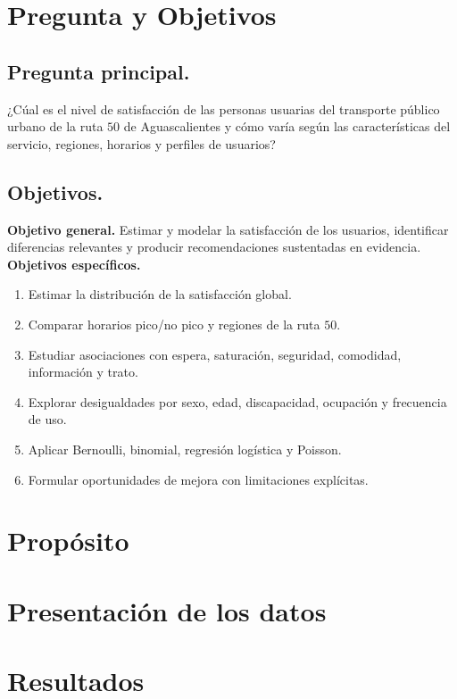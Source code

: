\documentclass{article}
\begin{document}
\section{Pregunta y Objetivos}

\subsection{Pregunta principal.}
¿Cúal es el nivel de satisfacción de las personas usuarias del transporte público urbano de la ruta $50$ de Aguascalientes y cómo varía según las características del servicio, regiones, horarios y perfiles de usuarios?
\subsection{Objetivos.}
\textbf{Objetivo general.} Estimar y modelar la satisfacción de los usuarios, identificar diferencias relevantes y producir recomendaciones sustentadas en evidencia. \\
\textbf{Objetivos específicos. }
\begin{enumerate}
    \item  Estimar la distribución de la satisfacción global. 
    \item Comparar horarios pico/no pico y regiones de la ruta $50$. 
    \item Estudiar asociaciones con espera, saturación, seguridad, comodidad, información y trato. 
    \item Explorar desigualdades por sexo, edad, discapacidad, ocupación y frecuencia de uso. 
    \item Aplicar Bernoulli, binomial, regresión logística y Poisson.
    \item Formular oportunidades de mejora con limitaciones explícitas.
    
\end{enumerate}

\section{Propósito}

\section{Presentación de los datos}

\section{Resultados}
\end{document}
